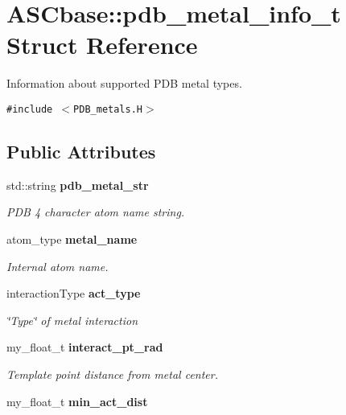 \section{ASCbase::pdb\_\-metal\_\-info\_\-t Struct Reference}
\label{structASCbase_1_1pdb__metal__info__t}
Information about supported PDB metal types.  


{\tt \#include $<$PDB\_\-metals.H$>$}

\subsection*{Public Attributes}
\begin{CompactItemize}
\item 
std::string \bf{pdb\_\-metal\_\-str}\label{structASCbase_1_1pdb__metal__info__t_8e625c4fafab8e1ff847552154be7499}

\begin{CompactList}\small\item\em PDB 4 character atom name string. \item\end{CompactList}\item 
atom\_\-type \bf{metal\_\-name}\label{structASCbase_1_1pdb__metal__info__t_f4efbc1c966cfe03d4f2344ecd36cf41}

\begin{CompactList}\small\item\em Internal atom name. \item\end{CompactList}\item 
interaction\-Type \bf{act\_\-type}\label{structASCbase_1_1pdb__metal__info__t_3a95b5df651db4595e660c0dbfffd1b4}

\begin{CompactList}\small\item\em \char`\"{}Type\char`\"{} of metal interaction \item\end{CompactList}\item 
my\_\-float\_\-t \bf{interact\_\-pt\_\-rad}\label{structASCbase_1_1pdb__metal__info__t_234095b78b3ddac53370f4f7416ebe1a}

\begin{CompactList}\small\item\em Template point distance from metal center. \item\end{CompactList}\item 
my\_\-float\_\-t \bf{min\_\-act\_\-dist}\label{structASCbase_1_1pdb__metal__info__t_eff78ccd9357744713418a32272b06ed}


\end{CompactItemize}
